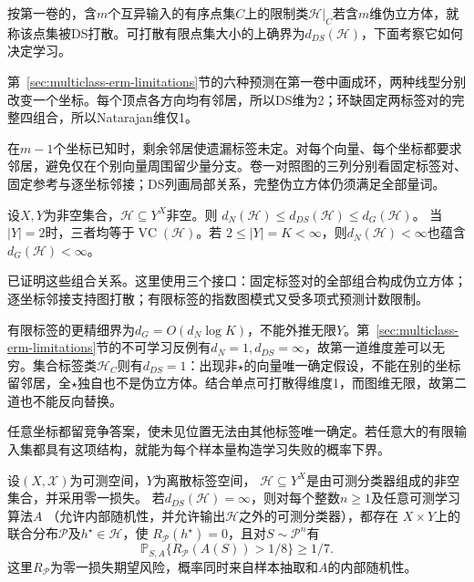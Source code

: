 按第一卷的，含$m$个互异输入的有序点集$C$上的限制类$\mathcal H|_C$若含$m$维伪立方体，就称该点集被DS打散。可打散有限点集大小的上确界为$d_{DS}(\mathcal H)$，下面考察它如何决定学习。

第~\ref{sec:multiclass-erm-limitations}节的六种预测在第一卷中画成环，两种线型分别改变一个坐标。每个顶点各方向均有邻居，所以DS维为2；环缺固定两标签对的完整四组合，所以Natarajan维仅1。

在$m-1$个坐标已知时，剩余邻居使遗漏标签未定。对每个向量、每个坐标都要求邻居，避免仅在个别向量周围留少量分支。卷一对照图的三列分别看固定标签对、固定参考与逐坐标邻接；DS列画局部关系，完整伪立方体仍须满足全部量词。

\begin{theorem}[多分类维度的比较]
\label{thm:learning-multiclass-dimension-comparison}
设$X,Y$为非空集合，$\mathcal H\subseteq Y^X$非空。则
$d_N(\mathcal H)\leq d_{DS}(\mathcal H)\leq d_G(\mathcal H)$。
当$|Y|=2$时，三者均等于$\operatorname{VC}(\mathcal H)$。若
$2\leq|Y|=K<\infty$，则$d_N(\mathcal H)<\infty$也蕴含
$d_G(\mathcal H)<\infty$。
\end{theorem}

已证明这些组合关系。这里使用三个接口：固定标签对的全部组合构成伪立方体；逐坐标邻接支持图打散；有限标签的指数图模式又受多项式预测计数限制。

有限标签的更精细界为$d_G=O(d_N\log K)$，不能外推无限$Y$。第~\ref{sec:multiclass-erm-limitations}节的不可学习反例有$d_N=1,d_{DS}=\infty$，故第一道维度差可以无穷。集合标签类$\mathcal H_C$则有$d_{DS}=1$：出现非$\star$的向量唯一确定假设，不能在别的坐标留邻居，全$\star$独自也不是伪立方体。结合单点可打散得维度1，而图维无限，故第二道也不能反向替换。

任意坐标都留竞争答案，使未见位置无法由其他标签唯一确定。若任意大的有限输入集都具有这项结构，就能为每个样本量构造学习失败的概率下界。

\begin{theorem}[无限DS维的不可学习性]
\label{thm:infinite-ds-lower-bound}
设$(X,\mathcal X)$为可测空间，$Y$为离散标签空间，
$\mathcal H\subseteq Y^X$是由可测分类器组成的非空集合，并采用零一损失。
若$d_{DS}(\mathcal H)=\infty$，则对每个整数$n\geq1$及任意可测学习算法$A$
（允许内部随机性，并允许输出$\mathcal H$之外的可测分类器），都存在
$X\times Y$上的联合分布$\mathcal P$及$h^\star\in\mathcal H$，使
$R_{\mathcal P}(h^\star)=0$，且对$S\sim\mathcal P^n$有
\[
 \mathbb P_{S,A}\{R_{\mathcal P}(A(S))>1/8\}\geq1/7.
\]
这里$R_{\mathcal P}$为零一损失期望风险，概率同时来自样本抽取和$A$的内部随机性。
\end{theorem}

